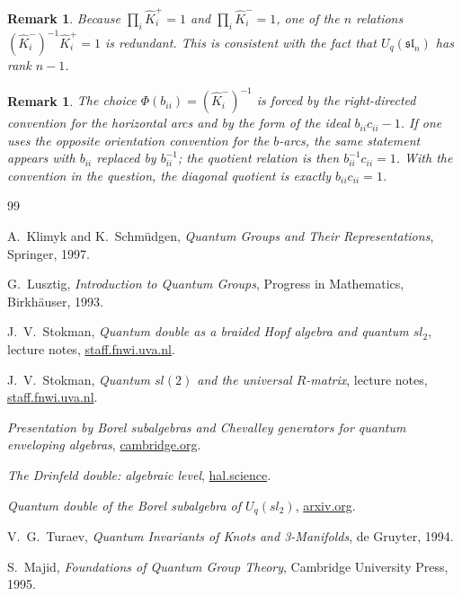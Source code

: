 \documentclass[11pt]{article}
\newcommand{\sln}{\mathfrak{sl}_n}
\newcommand{\Khat}{\widehat K}
\newtheorem{remark}[theorem]{Remark}
\begin{document}
\begin{remark}
Because \(\prod_i\Khat_i^+=1\) and \(\prod_i\Khat_i^-=1\), one of the \(n\) relations \((\Khat_i^-)^{-1}\Khat_i^+=1\) is redundant.  This is consistent with the fact that \(U_q(\sln)\) has rank \(n-1\).
\end{remark}

\begin{remark}
The choice \(\Phi(b_{ii})=(\Khat_i^-)^{-1}\) is forced by the right-directed convention for the horizontal arcs and by the form of the ideal \(b_{ii}c_{ii}-1\).  If one uses the opposite orientation convention for the \(b\)-arcs, the same statement appears with \(b_{ii}\) replaced by \(b_{ii}^{-1}\); the quotient relation is then \(b_{ii}^{-1}c_{ii}=1\).  With the convention in the question, the diagonal quotient is exactly \(b_{ii}c_{ii}=1\).
\end{remark}

\begin{thebibliography}{99}

A.~Klimyk and K.~Schm\"udgen,
\emph{Quantum Groups and Their Representations},
Springer, 1997.

G.~Lusztig,
\emph{Introduction to Quantum Groups},
Progress in Mathematics, Birkh\"auser, 1993.

J.~V.~Stokman,
\emph{Quantum double as a braided Hopf algebra and quantum \(sl_2\)},
lecture notes,
\href{https://staff.fnwi.uva.nl/j.v.stokman/quantumdouble2.pdf}{staff.fnwi.uva.nl}.

J.~V.~Stokman,
\emph{Quantum \(sl(2)\) and the universal \(R\)-matrix},
lecture notes,
\href{https://staff.fnwi.uva.nl/j.v.stokman/Quantumsl2.pdf}{staff.fnwi.uva.nl}.

\emph{Presentation by Borel subalgebras and Chevalley generators for quantum enveloping algebras},
\href{https://www.cambridge.org/core/services/aop-cambridge-core/content/view/886B0B4D8E3D242A51A0380A486351EA/S0013091504000689a.pdf/presentation-by-borel-subalgebras-and-chevalley-generators-for-quantum-enveloping-algebras.pdf}{cambridge.org}.

\emph{The Drinfeld double: algebraic level},
\href{https://hal.science/hal-02159493v1/file/CQG.pdf}{hal.science}.

\emph{Quantum double of the Borel subalgebra of \(U_q(sl_2)\)},
\href{https://arxiv.org/pdf/math/0512563}{arxiv.org}.

V.~G.~Turaev,
\emph{Quantum Invariants of Knots and 3-Manifolds},
de Gruyter, 1994.

S.~Majid,
\emph{Foundations of Quantum Group Theory},
Cambridge University Press, 1995.

\end{thebibliography}
\end{document}
